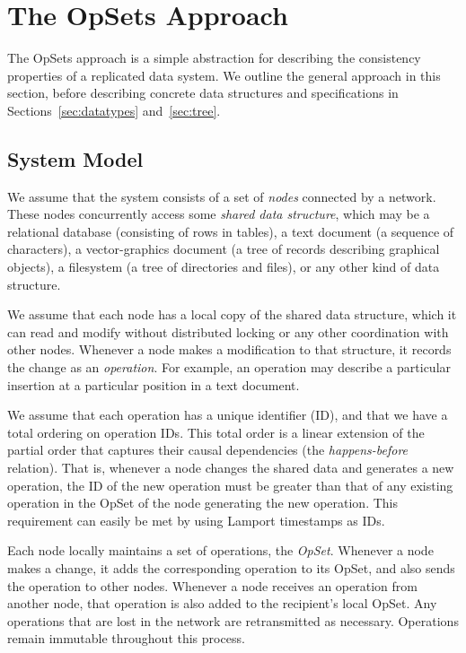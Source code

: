 \section{The OpSets Approach}\label{sec:approach}

The OpSets approach is a simple abstraction for describing the consistency properties of a replicated data system.
We outline the general approach in this section, before describing concrete data structures and specifications in Sections~\ref{sec:datatypes} and~\ref{sec:tree}.

\subsection{System Model}\label{sec:system-model}

We assume that the system consists of a set of \emph{nodes} connected by a network.
These nodes concurrently access some \emph{shared data structure}, which may be a relational database (consisting of rows in tables), a text document (a sequence of characters), a vector-graphics document (a tree of records describing graphical objects), a filesystem (a tree of directories and files), or any other kind of data structure.

We assume that each node has a local copy of the shared data structure, which it can read and modify without distributed locking or any other coordination with other nodes.
Whenever a node makes a modification to that structure, it records the change as an \emph{operation}.
For example, an operation may describe a particular insertion at a particular position in a text document.

We assume that each operation has a unique identifier (ID), and that we have a total ordering on operation IDs.
This total order is a linear extension of the partial order that captures their causal dependencies (the \emph{happens-before} relation).
That is, whenever a node changes the shared data and generates a new operation, the ID of the new operation must be greater than that of any existing operation in the OpSet of the node generating the new operation.
This requirement can easily be met by using Lamport timestamps \cite{Lamport:1978jq} as IDs.

Each node locally maintains a set of operations, the \emph{OpSet}.
Whenever a node makes a change, it adds the corresponding operation to its OpSet, and also sends the operation to other nodes.
Whenever a node receives an operation from another node, that operation is also added to the recipient's local OpSet.
Any operations that are lost in the network are retransmitted as necessary.
Operations remain immutable throughout this process.

